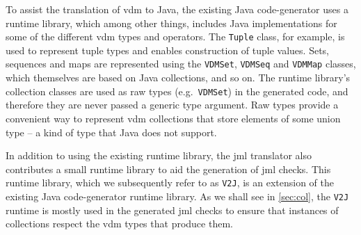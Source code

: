 To assist the translation of \ac{vdm} to Java, the existing Java
code-generator uses a runtime library, which among other things,
includes Java implementations for some of the different \ac{vdm} types
and operators. The \texttt{Tuple} class, for example, is used to
represent tuple types and enables construction of tuple values. Sets,
sequences and maps are represented using the \texttt{VDMSet},
\texttt{VDMSeq} and \texttt{VDMMap} classes, which themselves are
based on Java collections, and so on. The runtime library's collection
classes are used as raw types (e.g.\ \texttt{VDMSet}) in the generated
code, and therefore they are never passed a generic type argument. Raw
types provide a convenient way to represent \ac{vdm} collections that
store elements of some union type -- a kind of type that Java does not
support.

In addition to using the existing runtime library, the \ac{jml}
translator also contributes a small runtime library to aid the
generation of \ac{jml} checks. This runtime library, which we
subsequently refer to as \texttt{V2J}, is an extension of the existing
Java code-generator runtime library. As we shall see in
\autoref{sec:col}, the \texttt{V2J} runtime is mostly used in the
generated \ac{jml} checks to ensure that instances of collections
respect the \ac{vdm} types that produce them.


